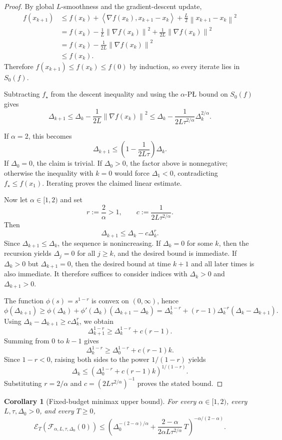 \documentclass[11pt]{article}
\newtheorem{corollary}[theorem]{Corollary}
\newcommand{\norm}[1]{\left\lVert #1\right\rVert}
\newcommand{\ip}[2]{\left\langle #1,#2\right\rangle}
\newcommand{\gap}{\Delta}
\begin{document}
\begin{proof}
By global $L$-smoothness and the gradient-descent update,
\[
\begin{aligned}
f(x_{k+1})
&\le
f(x_k)+\ip{\nabla f(x_k)}{x_{k+1}-x_k}+\frac{L}{2}\norm{x_{k+1}-x_k}^2\\
&=
f(x_k)-\frac1L\norm{\nabla f(x_k)}^2+\frac{1}{2L}\norm{\nabla f(x_k)}^2\\
&=
f(x_k)-\frac{1}{2L}\norm{\nabla f(x_k)}^2\\
&\le
f(x_k).
\end{aligned}
\]
Therefore $f(x_{k+1})\le f(x_k)\le f(0)$ by induction, so every iterate lies in $S_0(f)$.

Subtracting $f_\star$ from the descent inequality and using the $\alpha$-P\L{} bound on $S_0(f)$ gives
\[
\gap_{k+1}
\le
\gap_k-\frac{1}{2L}\norm{\nabla f(x_k)}^2
\le
\gap_k-\frac{1}{2L\tau^{2/\alpha}}\gap_k^{2/\alpha}.
\]

If $\alpha=2$, this becomes
\[
\gap_{k+1}\le \left(1-\frac{1}{2L\tau}\right)\gap_k.
\]
If \(\gap_0=0\), the claim is trivial. If \(\gap_0>0\), the factor above is nonnegative; otherwise the inequality
with \(k=0\) would force \(\gap_1<0\), contradicting \(f_\star\le f(x_1)\). Iterating proves the claimed linear
estimate.

Now let $\alpha\in[1,2)$ and set
\[
r:=\frac{2}{\alpha}>1,
\qquad
c:=\frac{1}{2L\tau^{2/\alpha}}.
\]
Then
\[
\gap_{k+1}\le \gap_k-c\gap_k^r.
\]
Since $\gap_{k+1}\le \gap_k$, the sequence is nonincreasing. If $\gap_k=0$ for some $k$, then the recursion yields
$\gap_j=0$ for all $j\ge k$, and the desired bound is immediate. If \(\gap_k>0\) but \(\gap_{k+1}=0\), then the
desired bound at time \(k+1\) and all later times is also immediate. It therefore suffices to consider indices with
\(\gap_k>0\) and \(\gap_{k+1}>0\).

The function $\phi(s)=s^{1-r}$ is convex on $(0,\infty)$, hence
\[
\phi(\gap_{k+1})
\ge
\phi(\gap_k)+\phi'(\gap_k)(\gap_{k+1}-\gap_k)
=
\gap_k^{1-r}+(r-1)\gap_k^{-r}(\gap_k-\gap_{k+1}).
\]
Using $\gap_k-\gap_{k+1}\ge c\gap_k^r$, we obtain
\[
\gap_{k+1}^{1-r}\ge \gap_k^{1-r}+c(r-1).
\]
Summing from $0$ to $k-1$ gives
\[
\gap_k^{1-r}\ge \gap_0^{1-r}+c(r-1)k.
\]
Since $1-r<0$, raising both sides to the power $1/(1-r)$ yields
\[
\gap_k\le \left(\gap_0^{1-r}+c(r-1)k\right)^{1/(1-r)}.
\]
Substituting $r=2/\alpha$ and $c=(2L\tau^{2/\alpha})^{-1}$ proves the stated bound.
\end{proof}

\begin{corollary}[Fixed-budget minimax upper bound]
\label{cor:upper}
For every $\alpha\in[1,2)$, every $L,\tau,\Delta_0>0$, and every $T\ge 0$,
\[
\mathcal E_T\!\left(\mathcal F_{\alpha,L,\tau,\Delta_0}(0)\right)
\le
\left(
\Delta_0^{-(2-\alpha)/\alpha}
+
\frac{2-\alpha}{2\alpha L\tau^{2/\alpha}}\,T
\right)^{-\alpha/(2-\alpha)}.
\]
\end{corollary}
\end{document}
